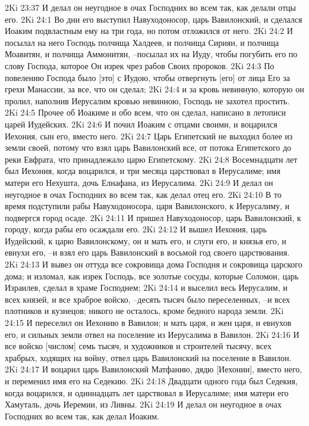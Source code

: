 2Ki 23:37  И делал он неугодное в очах Господних во всем так, как делали отцы его.
2Ki 24:1  Во дни его выступил Навуходоносор, царь Вавилонский, и сделался Иоаким подвластным ему на три года, но потом отложился от него.
2Ki 24:2  И посылал на него Господь полчища Халдеев, и полчища Сириян, и полчища Моавитян, и полчища Аммонитян, --посылал их на Иуду, чтобы погубить его по слову Господа, которое Он изрек чрез рабов Своих пророков.
2Ki 24:3  По повелению Господа было [это] с Иудою, чтобы отвергнуть [его] от лица Его за грехи Манассии, за все, что он сделал;
2Ki 24:4  и за кровь невинную, которую он пролил, наполнив Иерусалим кровью невинною, Господь не захотел простить.
2Ki 24:5  Прочее об Иоакиме и обо всем, что он сделал, написано в летописи царей Иудейских.
2Ki 24:6  И почил Иоаким с отцами своими, и воцарился Иехония, сын его, вместо него.
2Ki 24:7  Царь Египетский не выходил более из земли своей, потому что взял царь Вавилонский все, от потока Египетского до реки Евфрата, что принадлежало царю Египетскому.
2Ki 24:8  Восемнадцати лет был Иехония, когда воцарился, и три месяца царствовал в Иерусалиме; имя матери его Нехушта, дочь Елнафана, из Иерусалима.
2Ki 24:9  И делал он неугодное в очах Господних во всем так, как делал отец его.
2Ki 24:10  В то время подступили рабы Навуходоносора, царя Вавилонского, к Иерусалиму, и подвергся город осаде.
2Ki 24:11  И пришел Навуходоносор, царь Вавилонский, к городу, когда рабы его осаждали его.
2Ki 24:12  И вышел Иехония, царь Иудейский, к царю Вавилонскому, он и мать его, и слуги его, и князья его, и евнухи его, --и взял его царь Вавилонский в восьмой год своего царствования.
2Ki 24:13  И вывез он оттуда все сокровища дома Господня и сокровища царского дома; и изломал, как изрек Господь, все золотые сосуды, которые Соломон, царь Израилев, сделал в храме Господнем;
2Ki 24:14  и выселил весь Иерусалим, и всех князей, и все храброе войско, --десять тысяч было переселенных, --и всех плотников и кузнецов; никого не осталось, кроме бедного народа земли.
2Ki 24:15  И переселил он Иехонию в Вавилон; и мать царя, и жен царя, и евнухов его, и сильных земли отвел на поселение из Иерусалима в Вавилон.
2Ki 24:16  И все войско [числом] семь тысяч, и художников и строителей тысячу, всех храбрых, ходящих на войну, отвел царь Вавилонский на поселение в Вавилон.
2Ki 24:17  И воцарил царь Вавилонский Матфанию, дядю [Иехонии], вместо него, и переменил имя его на Седекию.
2Ki 24:18  Двадцати одного года был Седекия, когда воцарился, и одиннадцать лет царствовал в Иерусалиме; имя матери его Хамуталь, дочь Иеремии, из Ливны.
2Ki 24:19  И делал он неугодное в очах Господних во всем так, как делал Иоаким.
